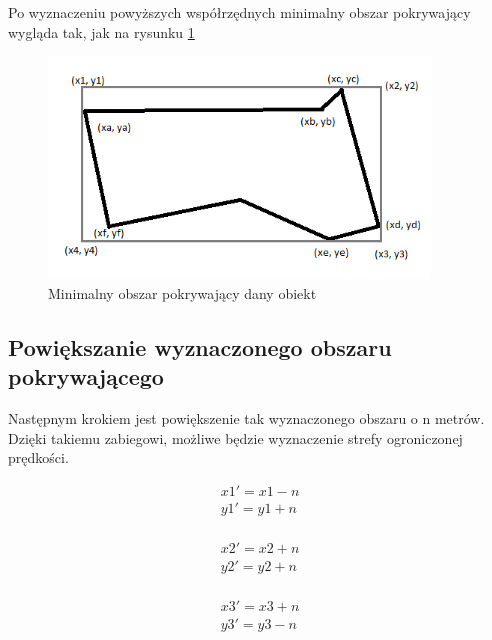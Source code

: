 Po wyznaczeniu powyższych współrzędnych minimalny obszar pokrywający wygląda tak, jak na rysunku \ref{sec:secondtBB} 

\newpage
\begin{figure}[h]
\label{sec:secondtBB}
\caption{Minimalny obszar pokrywający dany obiekt}
\centering
\includegraphics[width=0.9\textwidth]{minBoundingBox}
\end{figure}

\subsection{Powiększanie wyznaczonego obszaru pokrywającego}

Następnym krokiem jest powiększenie tak wyznaczonego obszaru o n metrów. Dzięki takiemu zabiegowi, możliwe będzie wyznaczenie strefy ogroniczonej prędkości. 


\begin{equation} \label{sec:powiekszoneWierzcholek}
\begin{split}
x1' = x1 - n \\
y1' = y1 + n \\
\end{split}
\end{equation}

\begin{equation} \label{sec:powiekszoneWierzcholek}
\begin{split}
x2' = x2 + n \\ 
y2' = y2 + n \\
\end{split}
\end{equation}

\begin{equation} \label{sec:powiekszoneWierzcholek}
\begin{split}
x3' = x3 + n \\
y3' = y3 - n \\
\end{split}
\end{equation}

